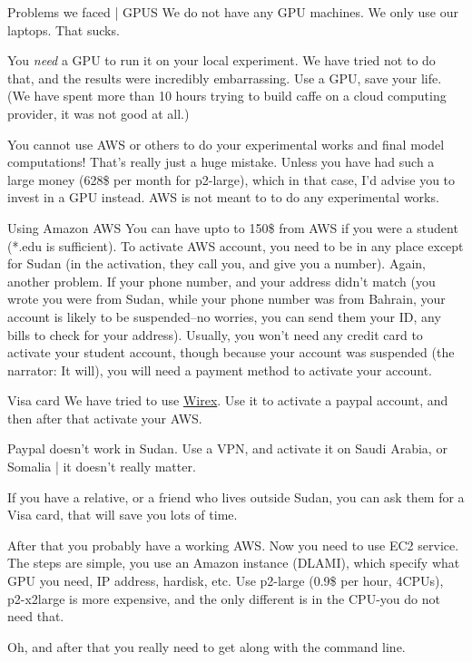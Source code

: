 \documentclass{beamer}
\begin{document}
\begin{frame}{Problems we faced | GPUS}
  We do not have any GPU machines. We only use our laptops. That sucks.

  You \textit{need} a GPU to run it on your local experiment. We have tried not
  to do that, and the results were incredibly embarrassing. Use a GPU, save your
  life. (We have spent more than 10 hours trying to build caffe on a cloud
  computing provider, it was not good at all.)

  You cannot use AWS or others to do your experimental works and final model
  computations! That's really just a huge mistake. Unless you have had such a
  large money (628\$ per month for p2-large), which in that case, I'd advise you
  to invest in a GPU instead. AWS is not meant to to do any experimental works.
\end{frame}

\begin{frame}{Using Amazon AWS}
  You can have upto to 150\$ from AWS if you were a student (*.edu is
  sufficient). To activate AWS account, you need to be in any place except for
  Sudan (in the activation, they call you, and give you a number). Again,
  another problem. If your phone number, and your address didn't match (you
  wrote you were from Sudan, while your phone number was from Bahrain, your
  account is likely to be suspended--no worries, you can send them your ID, any
  bills to check for your address). Usually, you won't need any credit card to
  activate your student account, though because your account was suspended (the
  narrator: It will), you will need a payment method to activate your account.
  
\end{frame}

\begin{frame}{Visa card}
  We have tried to use \href{https://app.wirexapp.com/}{Wirex}. Use it to
  activate a paypal account, and then after that activate your AWS.

  Paypal doesn't work in Sudan. Use a VPN, and activate it on Saudi Arabia, or
  Somalia | it doesn't really matter.

  If you have a relative, or a friend who lives outside Sudan, you can ask them
  for a Visa card, that will save you lots of time.

  After that you probably have a working AWS. Now you need to use EC2 service.
  The steps are simple, you use an Amazon instance (DLAMI), which specify what
  GPU you need, IP address, hardisk, etc. Use p2-large (0.9\$ per hour, 4CPUs),
  p2-x2large is more expensive, and the only different is in the CPU-you do not
  need that.

  Oh, and after that you really need to get along with the command line.
\end{frame}
\end{document}

